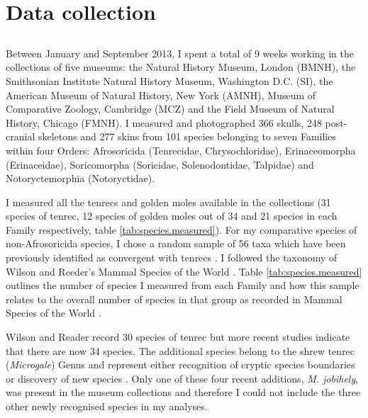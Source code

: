 \section{Data collection}
\label{sect:datacollection}


\subsection{}

	Between January and September 2013, I spent a total of 9 weeks working in the collections of five museums: the Natural History Museum, London (BMNH), the Smithsonian Institute Natural History Museum, Washington D.C. (SI), the American Museum of Natural History, New York (AMNH), Museum of Comparative Zoology, Cambridge (MCZ) and the Field Museum of Natural History, Chicago (FMNH). I measured and photographed 366 skulls, 248 post-cranial skeletons and 277 skins from 101 species belonging to seven Families within four Orders: Afrosoricida (Tenrecidae, Chrysochloridae), Erinaceomorpha (Erinaceidae), Soricomorpha (Soricidae, Solenodontidae, Talpidae) and Notoryctemorphia (Notoryctidae). 

	I measured all the tenrecs and golden moles available in the collections (31 species of tenrec, 12 species of golden moles out of 34 and 21 species in each Family respectively, table \ref{tab:species.measured}). 
	For my comparative species of non-Afrosoricida species, I chose a random sample of 56 taxa 
	which have been previously identified as convergent with tenrecs \citep[e.g.][]{Gould1966, Symonds2005, Poux2008, Olson2013}. I followed the taxonomy of Wilson and Reeder's Mammal Species of the World \citeyearpar[MSW,][]{Wilson2005}.
	Table \ref{tab:species.measured} outlines the number of species I measured from each Family and how this sample relates to the overall number of species in that group as recorded in Mammal Species of the World \citeyearpar{Wilson2005}.
	
	Wilson and Reader \citeyearpar{Wilson2005} record 30 species of tenrec but more recent studies indicate that there are now 34 species\citep[][Table \ref{tab:species.measured}]{Olson2013}. The additional species belong to the shrew tenrec (\textit{Microgale}) Genus and represent either recognition of cryptic species boundaries \citep{Olson2004} or discovery of new species \citep{Goodman2006, Olson2009}. Only one of these four recent additions, \textit{M. jobihely}, was present in the museum collections and therefore I could not include the three other newly recognised species in my analyses.

